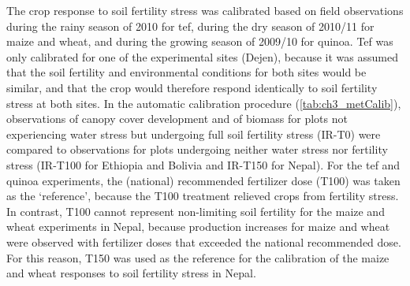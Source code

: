 The crop response to soil fertility stress was calibrated based on field observations during the rainy season of 2010 for tef, during the dry season of 2010/11 for maize and wheat, and during the growing season of 2009/10 for quinoa. Tef was only calibrated for one of the experimental sites (Dejen), because it was assumed that the soil fertility and environmental conditions for both sites would be similar, and that the crop would therefore respond identically to soil fertility stress at both sites. In the automatic calibration procedure (\autoref{tab:ch3_metCalib}), observations of canopy cover development and of biomass for plots not experiencing water stress but undergoing full soil fertility stress (IR-T0) were compared to observations for plots undergoing neither water stress nor fertility stress (IR-T100 for Ethiopia and Bolivia and IR-T150 for Nepal). For the tef and quinoa experiments, the (national) recommended fertilizer dose (T100) was taken as the `reference', because the T100 treatment relieved crops from fertility stress. In contrast, T100 cannot represent non-limiting soil fertility for the maize and wheat experiments in Nepal, because production increases for maize and wheat were observed with fertilizer doses that exceeded the national recommended dose. For this reason, T150 was used as the reference for the calibration of the maize and wheat responses to soil fertility stress in Nepal. 



